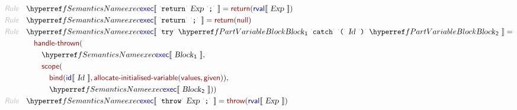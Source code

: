 \begin{align*}
  \KEY{Rule} \quad
    & \SEMREF{exec} \LEFTPHRASE \
                            \LEX{return} \ \VARHYPER{../.}{SIMPLE-2-Expressions}{Exp} \ \LEX{{;}} \
                          \RIGHTPHRASE  = 
      \NAMEHYPER{../../../../../Funcons-beta/Computations/Abnormal}{Returning}{return}
        (  \SEMHYPER{../.}{SIMPLE-2-Expressions}{rval} \LEFTPHRASE \
                                    \VAR{Exp} \
                                  \RIGHTPHRASE  )
\\
  \KEY{Rule} \quad
    & \SEMREF{exec} \LEFTPHRASE \
                            \LEX{return} \ \LEX{{;}} \
                          \RIGHTPHRASE  = 
      \NAMEHYPER{../../../../../Funcons-beta/Computations/Abnormal}{Returning}{return}
        (  \NAMEHYPER{../../../../../Funcons-beta/Values/Primitive}{Null}{null} )
\\
  \KEY{Rule} \quad
    & \SEMREF{exec} \LEFTPHRASE \
                            \LEX{try} \ \VARREF{Block}\SUB{1} \ \LEX{catch} \ \LEX{{(}} \ \VARHYPER{../.}{SIMPLE-1-Lexical}{Id} \ \LEX{{)}} \ \VARREF{Block}\SUB{2} \
                          \RIGHTPHRASE  = \\&\quad
      \NAMEHYPER{../../../../../Funcons-beta/Computations/Abnormal}{Throwing}{handle-thrown}
        ( \\&\quad\quad \SEMREF{exec} \LEFTPHRASE \
                                    \VAR{Block}\SUB{1} \
                                  \RIGHTPHRASE , \\&\quad\quad
               \NAMEHYPER{../../../../../Funcons-beta/Computations/Normal}{Binding}{scope}
                ( \\&\quad\quad\quad \NAMEHYPER{../../../../../Funcons-beta/Computations/Normal}{Binding}{bind}
                        (  \SEMHYPER{../.}{SIMPLE-1-Lexical}{id} \LEFTPHRASE \
                                                    \VAR{Id} \
                                                  \RIGHTPHRASE , 
                               \NAMEHYPER{../../../../../Funcons-beta/Computations/Normal}{Storing}{allocate-initialised-variable}
                                (  \NAMEHYPER{../../../../../Funcons-beta/Values}{Value-Types}{values}, 
                                       \NAMEHYPER{../../../../../Funcons-beta/Computations/Normal}{Giving}{given} ) ), \\&\quad\quad\quad
                       \SEMREF{exec} \LEFTPHRASE \
                                            \VAR{Block}\SUB{2} \
                                          \RIGHTPHRASE  ) )
\\
  \KEY{Rule} \quad
    & \SEMREF{exec} \LEFTPHRASE \
                            \LEX{throw} \ \VARHYPER{../.}{SIMPLE-2-Expressions}{Exp} \ \LEX{{;}} \
                          \RIGHTPHRASE  = 
      \NAMEHYPER{../../../../../Funcons-beta/Computations/Abnormal}{Throwing}{throw}
        (  \SEMHYPER{../.}{SIMPLE-2-Expressions}{rval} \LEFTPHRASE \
                                    \VAR{Exp} \
                                  \RIGHTPHRASE  )
\end{align*}
